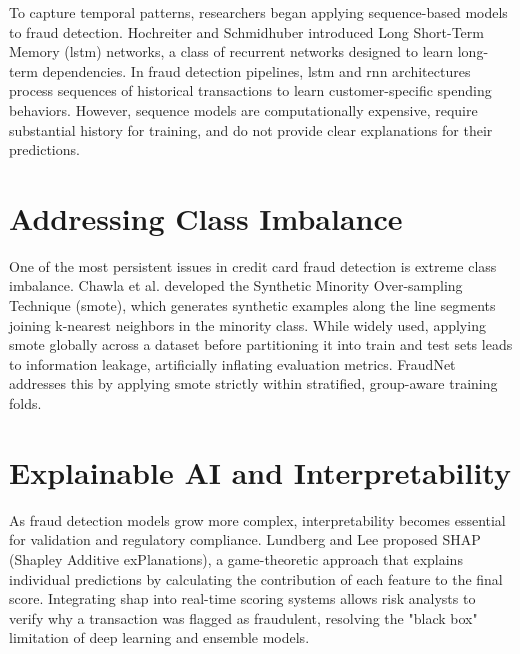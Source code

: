 To capture temporal patterns, researchers began applying sequence-based models to fraud detection. Hochreiter and Schmidhuber \cite{hochreiter1997lstm} introduced Long Short-Term Memory (\gls{lstm}) networks, a class of recurrent networks designed to learn long-term dependencies. In fraud detection pipelines, \gls{lstm} and \gls{rnn} architectures process sequences of historical transactions to learn customer-specific spending behaviors. However, sequence models are computationally expensive, require substantial history for training, and do not provide clear explanations for their predictions.


\section{Addressing Class Imbalance}

One of the most persistent issues in credit card fraud detection is extreme class imbalance. Chawla et al. \cite{chawla2002smote} developed the Synthetic Minority Over-sampling Technique (\gls{smote}), which generates synthetic examples along the line segments joining k-nearest neighbors in the minority class. While widely used, applying \gls{smote} globally across a dataset before partitioning it into train and test sets leads to information leakage, artificially inflating evaluation metrics. FraudNet addresses this by applying \gls{smote} strictly within stratified, group-aware training folds.

\section{Explainable AI and Interpretability}

As fraud detection models grow more complex, interpretability becomes essential for validation and regulatory compliance. Lundberg and Lee \cite{lundberg2017unified} proposed SHAP (Shapley Additive exPlanations), a game-theoretic approach that explains individual predictions by calculating the contribution of each feature to the final score. Integrating \gls{shap} into real-time scoring systems allows risk analysts to verify why a transaction was flagged as fraudulent, resolving the "black box" limitation of deep learning and ensemble models.

